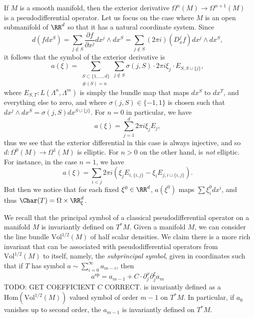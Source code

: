 \begin{example}
    If $M$ is a smooth manifold, then the exterior derivative $\Omega^n(M) \to \Omega^{n+1}(M)$ is a pseudodifferential operator. Let us focus on the case where $M$ is an open submanifold of $\RR^d$ so that it has a natural coordinate system. Since
    \[ d(f dx^S) = \sum_{j \not \in S} \frac{\partial f}{\partial x^j} dx^j \wedge dx^S = \sum_{j \not \in S} (2 \pi i) (D_x^j f) dx^j \wedge dx^S, \]
    it follows that the symbol of the exterior derivative is
    \[ a(\xi) = \sum_{\substack{S \subset \{ 1, \dots, d \}\\\#(S) = n}} \sum_{j \not \in S} \sigma(j,S) \cdot 2 \pi i \xi_j \cdot E_{S,S \cup \{ j \}}, \]
    where $E_{S,T}: L(\Lambda^n, \Lambda^m)$ is simply the bundle map that maps $dx^S$ to $dx^T$, and everything else to zero, and where $\sigma(j,S) \in \{ -1, 1 \}$ is chosen such that $dx^j \wedge dx^S = \sigma(j,S) dx^{S \cup \{ j \}}$. For $n = 0$ in particular, we have
    \[ a(\xi) = \sum_{j = 1}^d 2 \pi i \xi_j E_j, \]
    thus we see that the exterior differential in this case is always injective, and so $d: \Omega^0(M) \to \Omega^1(M)$ is elliptic. For $n > 0$ on the other hand, is \emph{not} elliptic. For instance, in the case $n = 1$, we have
    \[ a(\xi) = \sum_{i < j} 2 \pi i (\xi_j E_{i, \{ i, j \}} - \xi_i E_{j, i \cup \{ i,j \}} ). \]
    But then we notice that for each fixed $\xi^0 \in \RR^d$, $a(\xi^0)$ maps $\sum \xi^0_i dx^i$, and thus $\Char(T) = \Omega \times \RR^d_\xi$.
\end{example}

\begin{example}
    We recall that the principal symbol of a classical pseudodifferential operator on a manifold $M$ is invariantly defined on $T^*M$. Given a manifold $M$, we can consider the line bundle $\text{Vol}^{1/2}(M)$ of half scalar densities. We claim there is a more rich invariant that can be associated with pseudodifferential operators from $\text{Vol}^{1/2}(M)$ to itself, namely, the \emph{subprincipal symbol}, given in coordinates such that if $T$ has symbol $a \sim \sum_{i = 0}^\infty a_{m-i}$, then
    \[ a^{\text{sp}} = a_{m-1} + C \cdot \partial_j^x \partial_j^\xi a_m \]
    TODO: GET COEFFICIENT $C$ CORRECT. is invariantly defined as a $\text{Hom}(\text{Vol}^{1/2}(M))$ valued symbol of order $m-1$ on $T^*M$.
    In particular, if $a_0$ vanishes up to second order, the $a_{m-1}$ is invariantly defined on $T^*M$.
\end{example}





